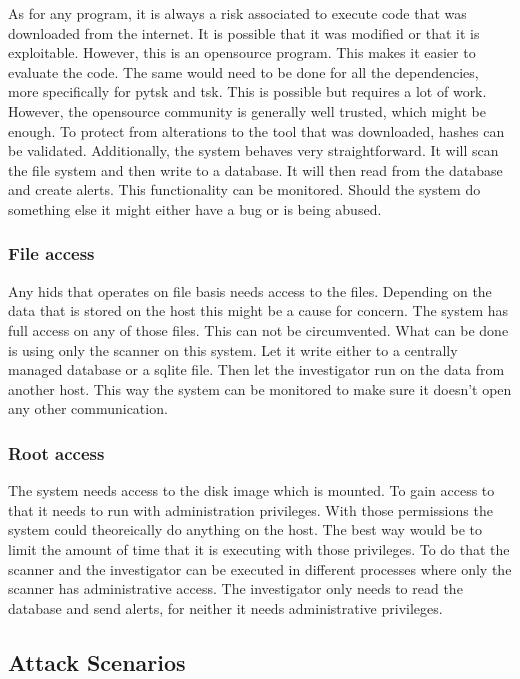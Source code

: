 \documentclass[
	a4paper,					%
	10pt,							%
	twoside,					%
	openright,				%
	notitlepage,			%
	parskip=half,			%
]{scrreprt}					%
\begin{document}
As for any program, it is always a risk associated to execute code that was downloaded from the internet. It is possible that it was modified or that it is exploitable. However, this is an \gls{opensource} program. This makes it easier to evaluate the code. The same would need to be done for all the dependencies, more specifically for \gls{pytsk} and \gls{tsk}. This is possible but requires a lot of work. However, the \gls{opensource} community is generally well trusted, which might be enough. To protect from alterations to the tool that was downloaded, hashes can be validated. Additionally, the system behaves very straightforward. It will scan the file system and then write to a database. It will then read from the database and create alerts. This functionality can be monitored. Should the system do something else it might either have a bug or is being abused.

\subsubsection{File access}
\label{sec:risk:file}

Any \gls{hids} that operates on file basis needs access to the files. Depending on the data that is stored on the host this might be a cause for concern. The system has full access on any of those files. This can not be circumvented. What can be done is using only the scanner on this system. Let it write either to a centrally managed database or a sqlite file. Then let the investigator run on the data from another host. This way the system can be monitored to make sure it doesn't open any other communication.

\subsubsection{Root access}
\label{sec:risk:root}

The system needs access to the disk image which is mounted. To gain access to that it needs to run with administration privileges. With those permissions the system could theoreically do anything on the host. The best way would be to limit the amount of time that it is executing with those privileges. To do that the scanner and the investigator can be executed in different processes where only the scanner has administrative access. The investigator only needs to read the database and send alerts, for neither it needs administrative privileges.

\subsection{Attack Scenarios}
\label{sec:attack_scenarios}
\end{document}
